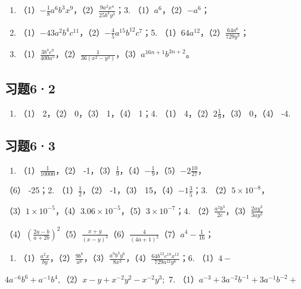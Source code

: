 \begin{enumerate}[start=2]
\item
  （1）\(-\frac{1}{8} a^6 b^3 x^9\)，（2）\(\frac{9a^2 x^4}{25b^4 y^3}\)；3.
  （1）\(a^6\)，（2）\(-a^6\)；
\item
  （1）\(-43a^{2}b^{4}c^{11}\)，（2）\(-\frac{4}{5}a^{15}b^{12}c^{7}\)；5.
  （1）\(64a^{12}\)，（2）\(\frac{64a^{6}}{729y^{3}}\)；
\item
  （1）\(\frac{3b^4c^9}{400a^5}\)，（2）\(\frac{1}{36(x^2 - y^2)}\)，（3）\(a^{16n + 1}b^{3n + 2}\)。
\end{enumerate}

\subsection{习题6·2}

\begin{enumerate}
\item
  （1） 2，（2） 0，（3） 1，（4） 1；4. （1）
  4，（2）\(2\frac{1}{9}\)，（3） 0，（4） -4.
\end{enumerate}

\subsection{习题6·3}

\begin{enumerate}
\item
  （1）\(\frac{1}{10000}\)，（2）
  -1，（3）\(\frac{1}{9}\)，（4）\(-\frac{1}{9}\)，（5）\(-2\frac{10}{27}\)，
\end{enumerate}

（6） -25；2. （1）\(\frac{1}{2}\)，（2） -1，（3）
15，（4）\(-1\frac{3}{5}\)；3. （2）\(5 \times 10^{-8}\)，

（3）\(1 \times 10^{-5}\)，（4）\(3.06 \times 10^{-5}\)，（5）\(3 \times 10^{-7}\)；4.
（2）\(\frac{a^2 b^3}{2c}\)，（3）\(\frac{2a y^3}{3a y^2}\)

（4）\(\left(\frac{2a - b}{a + 2b}\right)^2\)（5）\(\frac{x + y}{(x - y)^3}\)（6）\(\frac{4}{(4a + 1)^2}\)（7）\(a^4 - \frac{1}{16}\)；

\begin{enumerate}[start=5]
\item
  （1）\(\frac{a^2x}{by}\)，（2）\(\frac{9b^6}{a^6}\)，（3）\(\frac{a^9b^3y^6}{8x^3}\)，（4）\(\frac{64b^{12}c^{18}x^{12}}{729a^{12}y^6}\)；6.
  （1）\(4-\)
\end{enumerate}

\(4a^{-6}b^{6} + a^{-1}b^{4},\)（2）\(x - y + x^{-2}y^{2} - x^{-2}y^{3};\)
7. （1）\(a^{-3} + 3a^{-2}b^{-1} + 3a^{-1}b^{-2}+\)

